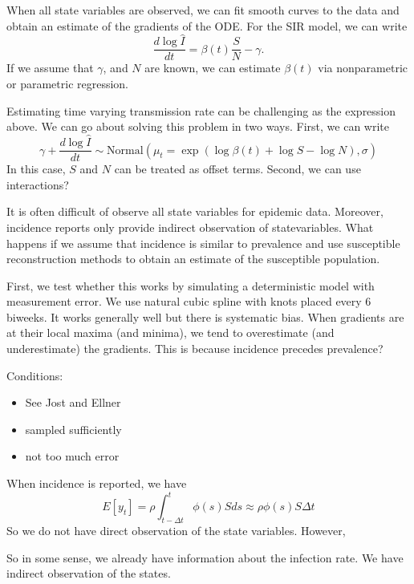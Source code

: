 \documentclass{article}
\begin{document}
When all state variables are observed, we can fit smooth curves to the data and obtain an estimate of the gradients of the ODE.
For the SIR model, we can write
\begin{equation}
\frac{d\log \hat{I}}{dt} = \beta(t) \frac{S}{N} - \gamma.
\end{equation}
If we assume that $\gamma$, and $N$ are known, we can estimate $\beta(t)$ via nonparametric or parametric regression.

Estimating time varying transmission rate can be challenging as the expression above.
We can go about solving this problem in two ways.
First, we can write
\begin{equation}
\gamma + \frac{d\log \hat{I}}{dt} \sim \mathrm{Normal}\left(\mu_t=\exp\left( \log \beta(t) + \log S - \log N\right), \sigma\right)
\end{equation}
In this case, $S$ and $N$ can be treated as offset terms.
Second, we can use interactions?


It is often difficult of observe all state variables for epidemic data.
Moreover, incidence reports only provide indirect observation of statevariables.
What happens if we assume that incidence is similar to prevalence and use susceptible reconstruction methods to obtain an estimate of the susceptible population.

First, we test whether this works by simulating a deterministic model with measurement error.
We use natural cubic spline with knots placed every 6 biweeks.
It works generally well but there is systematic bias.
When gradients are at their local maxima (and minima), we tend to overestimate (and underestimate) the gradients.
This is because incidence precedes prevalence?



Conditions:
\begin{itemize}
	\item See Jost and Ellner 
	\item sampled sufficiently
	\item not too much error
\end{itemize}


When incidence is reported, we have
\begin{equation}
E[y_t] = \rho \int_{t-\Delta t}^{t} \phi(s) S ds \approx \rho \phi(s) S \Delta t
\end{equation}
So we do not have direct observation of the state variables.
However, 

So in some sense, we already have information about the infection rate. 
We have indirect observation of the states.
\end{document}
